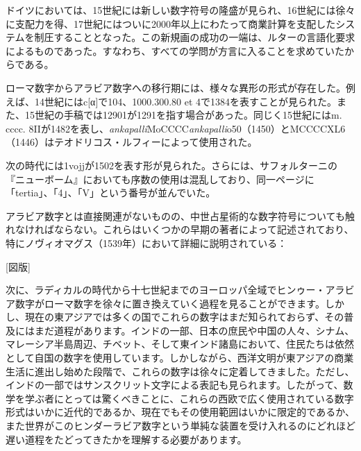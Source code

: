 \documentclass[a4paper,11pt,openany]{ltjsbook}
\begin{document}
ドイツにおいては、15世紀には新しい数字符号の隆盛が見られ、16世紀には徐々に支配力を得、17世紀にはついに2000年以上にわたって商業計算を支配したシステムを制圧することとなった。この新規画の成功の一端は、ルターの言語化要求によるものであった。すなわち、すべての学問が方言に入ることを求めていたからである。

ローマ数字からアラビア数字への移行期には、様々な異形の形式が存在した。例えば、14世紀にはc[α]で104、1000.300.80 et 4で1384を表すことが見られた。また、15世紀の手稿では12901が1291を指す場合があった。同じく15世紀にはm. cccc. 8IIが1482を表し、\textit{ankapalli}M{oCCCC}\textit{ankapalli}o50（1450）とMCCCCXL6（1446）はテオドリコス・ルフィーによって使用された。

次の時代には1vojjが1502を表す形が見られた。さらには、サフォルターニの『ニューボーム』においても序数の使用は混乱しており、同一ページに「tertia」、「4」、「V」という番号が並んでいた。

アラビア数字とは直接関連がないものの、中世占星術的な数字符号についても触れなければならない。これらはいくつかの早期の著者によって記述されており、特にノヴィオマグス（1539年）において詳細に説明されている：

[図版]

次に、ラディカルの時代から十七世紀までのヨーロッパ全域でヒンゥー・アラビア数字がローマ数字を徐々に置き換えていく過程を見ることができます。しかし、現在の東アジアでは多くの国でこれらの数字はまだ知られておらず、その普及にはまだ道程があります。インドの一部、日本の庶民や中国の人々、シナム、マレーシア半島周辺、チベット、そして東インド諸島において、住民たちは依然として自国の数字を使用しています。しかしながら、西洋文明が東アジアの商業生活に進出し始めた段階で、これらの数字は徐々に定着してきました。ただし、インドの一部ではサンスクリット文字による表記も見られます。したがって、数学を学ぶ者にとっては驚くべきことに、これらの西欧で広く使用されている数字形式はいかに近代的であるか、現在でもその使用範囲はいかに限定的であるか、また世界がこのヒンダーラビア数字という単純な装置を受け入れるのにどれほど遅い道程をたどってきたかを理解する必要があります。

\clearpage
\end{document}
